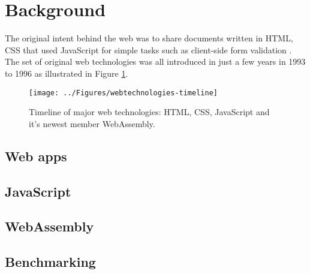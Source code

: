\section{Background}
\label{background}

The original intent behind the web was to share documents written in HTML, CSS that used JavaScript for simple tasks such as client-side form validation \parencite{Zakai2018,Moller2018}. The set of original web technologies was all introduced in just a few years in 1993 to 1996 as illustrated in Figure \ref{figure:webtechnologies-timeline}.


\begin{figure}[!h]
\centering
\texttt{[image: ../Figures/webtechnologies-timeline]}
\caption{Timeline of major web technologies: HTML, CSS, JavaScript and it's newest member WebAssembly.}
\label{figure:webtechnologies-timeline}
\end{figure}

\subsection{Web apps}


\subsection{JavaScript}


\subsection{WebAssembly}


\subsection{Benchmarking}

